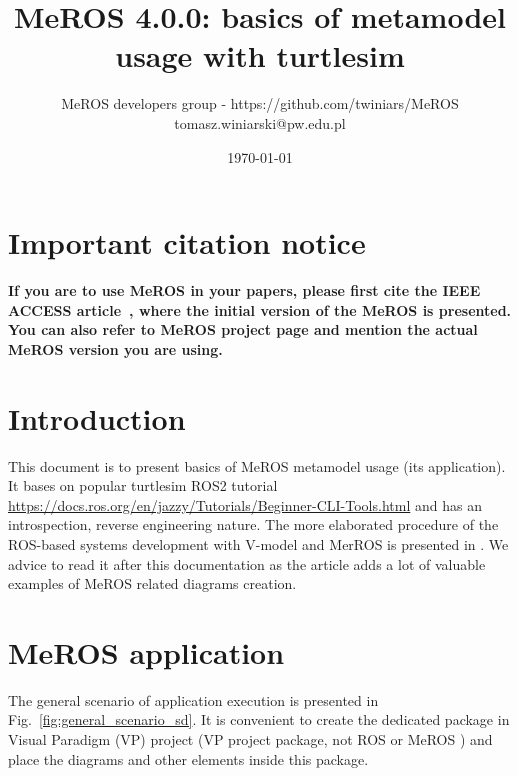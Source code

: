 \documentclass[11pt,oneside,a4paper]{report}
\begin{document}
	
\title{MeROS 4.0.0: basics of metamodel usage with turtlesim}
\author{MeROS developers group - https://github.com/twiniars/MeROS \\ tomasz.winiarski@pw.edu.pl}
\date{\today}
\maketitle

	
\chapter*{Important citation notice}

\textbf{If you are to use MeROS in your papers, please first cite the IEEE ACCESS  article~\cite{meros-access}, where the initial version of the MeROS is presented. You can also refer to MeROS project page \cite{meros-www} and mention the actual MeROS version you are using.}
	
\chapter{Introduction}
\label{ch:introduction}

	This document is to present basics of MeROS metamodel usage (its application). It bases on popular turtlesim ROS2 tutorial \url{https://docs.ros.org/en/jazzy/Tutorials/Beginner-CLI-Tools.html} and has an introspection, reverse engineering nature. The more elaborated procedure of the ROS-based systems development with V-model and MerROS is presented in \cite{winiarski2025-v-model}. We advice to read it after this documentation as the article adds a lot of valuable examples of MeROS related diagrams creation. 

\chapter{MeROS application}
\label{ch:application}

The general scenario of application execution is presented in Fig.~\ref{fig:general_scenario_sd}. It is convenient to create the dedicated package in Visual Paradigm (VP) project (VP project package, not ROS or MeROS \stPackage{}) and place the diagrams and other elements inside this package.
\end{document}
